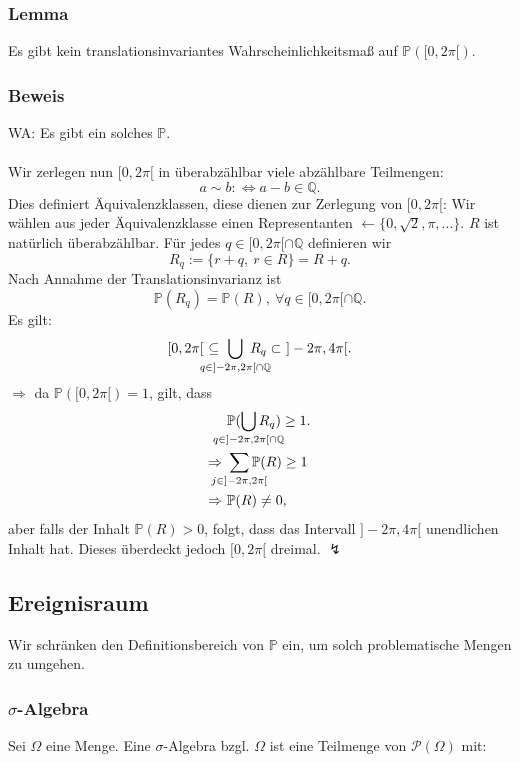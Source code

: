 \subsubsection{Lemma}
Es gibt kein translationsinvariantes Wahrscheinlichkeitsma\ss{} auf $\mathbb{P}([0,2\pi[)$.
\subsubsection{Beweis}
WA: Es gibt ein solches $\mathbb{P}$.
\\~\\
Wir zerlegen nun $[0,2\pi[$ in \"uberabz\"ahlbar viele abz\"ahlbare Teilmengen:
\[
a\sim b:\Leftrightarrow a-b\in\mathbb{Q}.
\]
Dies definiert \"Aquivalenzklassen, diese dienen zur Zerlegung von $[0,2\pi[$:
Wir w\"ahlen aus jeder \"Aquivalenzklasse einen Representanten $\leftarrow\{0,\sqrt{2},\pi,\ldots\}$. $R$ ist nat\"urlich \"uberabz\"ahlbar. F\"ur jedes $q\in[0,2\pi[\cap\mathbb{Q}$ definieren wir
\[
R_q:=\{r+q,\ r\in R\}=R+q.
\]
Nach Annahme der Translationsinvarianz ist
\[
\mathbb{P}(R_q)=\mathbb{P}(R),\ \forall q\in[0,2\pi[\cap\mathbb{Q}.
\]
Es gilt:
\[
[0,2\pi[\ \subseteq\ \bigcup_{\mathclap{q\in]-2\pi,2\pi[\cap\mathbb{Q}}}\ R_q\subset\ ]-2\pi,4\pi[.
\]
$\Rightarrow$ da $\mathbb{P}([0,2\pi[)=1$, gilt, dass
\begin{align*}
    &\mathbb{P}(\bigcup_{\mathclap{q\in]-2\pi,2\pi[\cap\mathbb{Q}}}R_q)\geq1.\\
    \Rightarrow\ &\sum_{\mathclap{j\in]-2\pi,2\pi[}}\mathbb{P}(R)\geq1\\
    \Rightarrow\ &\mathbb{P}(R)\neq0,
\end{align*}
aber falls der Inhalt $\mathbb{P}(R)>0$, folgt, dass das Intervall $]-2\pi,4\pi[$ unendlichen Inhalt hat. Dieses \"uberdeckt jedoch $[0,2\pi[$ dreimal. $\lightning$
\subsection{Ereignisraum}
Wir schr\"anken den Definitionsbereich von $\mathbb{P}$ ein, um solch problematische Mengen zu umgehen. 
\subsubsection{$\sigma$-Algebra}
Sei $\Omega$ eine Menge. Eine $\sigma$-Algebra bzgl. $\Omega$ ist eine Teilmenge von $\mathcal{P}(\Omega)$ mit:

